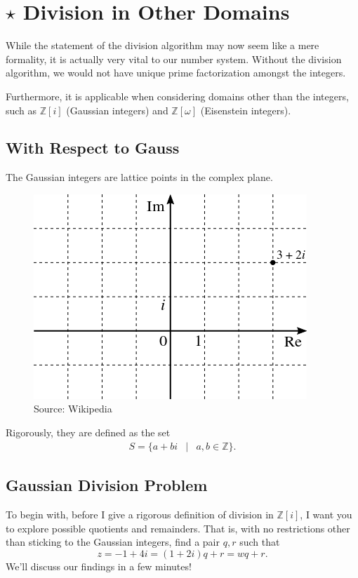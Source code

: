 \clearpage 
\section{$\star$ Division in Other Domains}

While the statement of the division algorithm may now seem like a mere formality, it is actually very vital to our number system. Without the division algorithm, we would not have unique prime factorization amongst the integers.

Furthermore, it is applicable when considering domains other than the integers, such as $\mathbb{Z}[i]$ (Gaussian integers) and $\mathbb{Z}[\omega]$ (Eisenstein integers).  


\subsection*{With Respect to Gauss}

The Gaussian integers are lattice points in the complex plane. \cite{iurie}

\begin{figure}[H]
	\centering\includegraphics[width=0.21\linewidth]{images/gauss.png}
	\caption{Source:  Wikipedia}
\end{figure}

Rigorously, they are defined as the set \begin{eqnarray*}S=\{a+bi &|& a,b \in \mathbb{Z}\}. \end{eqnarray*}  

\clearpage

\subsection{Gaussian Division Problem \cite{div:1}}


To begin with, before I give a rigorous definition of division in $\mathbb{Z}[i]$, I want you to explore possible quotients and remainders. That is, with no restrictions other than sticking to the Gaussian integers, find a pair $q,r$ such that $$z=-1+4i=(1+2i)q+r=wq+r.$$   We'll discuss our findings in a few minutes!

